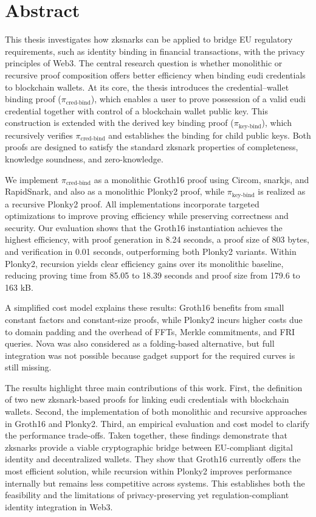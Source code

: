 \section*{Abstract}
This thesis investigates how \acrshort{zksnark}s can be applied to bridge EU regulatory requirements, such as identity binding in financial transactions, with the privacy principles of Web3. The central research question is whether monolithic or recursive proof composition offers better efficiency when binding \acrshort{eudi} credentials to blockchain wallets. At its core, the thesis introduces the credential–wallet binding proof ($\pi_{\text{cred-bind}}$), which enables a user to prove possession of a valid \acrshort{eudi} credential together with control of a blockchain wallet public key. This construction is extended with the derived key binding proof ($\pi_{\text{key-bind}}$), which recursively verifies $\pi_{\text{cred-bind}}$ and establishes the binding for child public keys. Both proofs are designed to satisfy the standard \acrshort{zksnark} properties of completeness, knowledge soundness, and zero-knowledge.

We implement $\pi_{\text{cred-bind}}$ as a monolithic Groth16 proof using Circom, snarkjs, and RapidSnark, and also as a monolithic Plonky2 proof, while $\pi_{\text{key-bind}}$ is realized as a recursive Plonky2 proof. All implementations incorporate targeted optimizations to improve proving efficiency while preserving correctness and security. Our evaluation shows that the Groth16 instantiation achieves the highest efficiency, with proof generation in 8.24 seconds, a proof size of 803 bytes, and verification in 0.01 seconds, outperforming both Plonky2 variants. Within Plonky2, recursion yields clear efficiency gains over its monolithic baseline, reducing proving time from 85.05 to 18.39 seconds and proof size from 179.6 to 163 kB.

A simplified cost model explains these results: Groth16 benefits from small constant factors and constant-size proofs, while Plonky2 incurs higher costs due to domain padding and the overhead of FFTs, Merkle commitments, and FRI queries. Nova was also considered as a folding-based alternative, but full integration was not possible because gadget support for the required curves is still missing.

The results highlight three main contributions of this work. First, the definition of two new \acrshort{zksnark}-based proofs for linking \acrshort{eudi} credentials with blockchain wallets. Second, the implementation of both monolithic and recursive approaches in Groth16 and Plonky2. Third, an empirical evaluation and cost model to clarify the performance trade-offs. Taken together, these findings demonstrate that \acrshort{zksnark}s provide a viable cryptographic bridge between EU-compliant digital identity and decentralized wallets. They show that Groth16 currently offers the most efficient solution, while recursion within Plonky2 improves performance internally but remains less competitive across systems. This establishes both the feasibility and the limitations of privacy-preserving yet regulation-compliant identity integration in Web3.